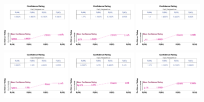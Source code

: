 


\begin{figure}[th]
\centering
\includegraphics[width=0.30\textwidth]{Figures/MirrorRating_Exp2_P1} \includegraphics[width=0.30\textwidth]{Figures/MirrorRating_Exp2_P2} \includegraphics[width=0.30\textwidth]{Figures/MirrorRating_Exp2_P3}
\includegraphics[width=0.30\textwidth]{Figures/MirrorRating_Exp2_P4} \includegraphics[width=0.30\textwidth]{Figures/MirrorRating_Exp2_P5} \includegraphics[width=0.30\textwidth]{Figures/MirrorRating_Exp2_P6}

\end{figure}
